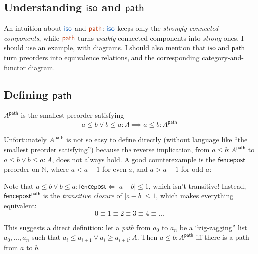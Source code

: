 \documentclass{rntz}
\newcommand{\todo}[1]{{\color{Rhodamine}#1}}
\newcommand{\ms}[1]{\ensuremath{\mathsf{#1}}}
\newcommand{\N}{\mathbb{N}}
\newcommand{\iso}{\ms{iso}}     %
\renewcommand{\path}{\ms{path}} %
\newcommand{\ti}{{\color{NavyBlue}\iso}}     %
\newcommand{\tb}{{\color{Bittersweet}\path}} %
\begin{document}
\subsection{Understanding \iso{} and \path{}}

\todo{An intuition about $\ti$ and $\tb$: $\ti$ keeps only the \emph{strongly
    connected components}, while $\tb$ turns \emph{weakly} connected components
  into \emph{strong} ones. I should use an example, with diagrams. I should also
  mention that \iso{} and \path{} turn preorders into equivalence relations, and
  the corresponding category-and-functor diagram.}

\subsection{Defining \path{}} \label{sec:defining-path}

$A^\path$ is the smallest preorder satisfying
\[ a \le b \vee b \le a : A \implies a \le b : A^\path \]

Unfortunately $A^\path$ is not so easy to define directly (without
language like ``the smallest preorder satisfying'')
%
because the reverse implication, from $a \le b : A^\path$ to $a \le b \vee b \le
a : A$, does not always hold. A good counterexample is the \ms{fencepost}
preorder on $\N$, where $a < a+1$ for even $a$, and $a > a+1$ for odd $a$:

\begin{center}
\end{center}

Note that $a \le b \vee b \le a : \ms{fencepost} \iff |a-b| \le 1$, which isn't
transitive! Instead, $\ms{fencepost}^\path$ is the \emph{transitive closure} of
$|a-b| \le 1$, which makes everything equivalent:
\[ 0 \equiv 1 \equiv 2 \equiv 3 \equiv 4 \equiv \dots \]

This suggests a direct definition: let a \emph{path} from $a_0$ to $a_n$ be a
``zig-zagging'' list $a_0, \dots, a_n$ such that $a_i \le a_{i+1} \vee a_i \ge
a_{i+1} : A$. Then $a \le b : A^\path$ iff there is a path from $a$ to $b$.
\end{document}
